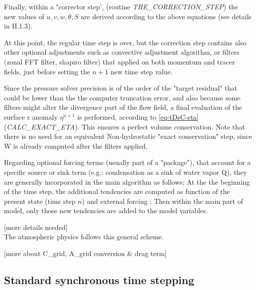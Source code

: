 Finally, within a "corrector step', 
(routine {\it THE\_CORRECTION\_STEP})
the new values of $u,v,w,\theta,S$ 
are derived according to the above equations
(see details in II.1.3). 

At this point, the regular time step is over, but  
the correction step contains also other optional
adjustments such as convective adjustment algorithm, or filters 
(zonal FFT filter, shapiro filter)
that applied on both momentum and tracer fields.
just before setting the $n+1$ new time step value.

Since the pressure solver precision is of the order of
the "target residual" that could be lower than the 
the computer truncation error, and also because some filters 
might alter the divergence part of the flow field,
a final evaluation of the surface r anomaly $\eta^{n+1}$
is performed, according to \ref{eq-tDsC-eta} ({\it CALC\_EXACT\_ETA}).
This ensures a perfect volume conservation.
Note that there is no need for an equivalent Non-hydrostatic
"exact conservation" step, since W is already computed after 
the filters applied.

Regarding optional forcing terms (usually part of a "package"), 
that account for a specific source or sink term (e.g.: condensation
as a sink of water vapor Q), they are generally incorporated 
in the main algorithm as follows;
At the the beginning of the time step,
the additional tendencies are computed
as function of the present state (time step $n$) and external forcing ;
Then within the main part of model,
only those new tendencies are added to the model variables.

[more details needed]\\

The atmospheric physics follows this general scheme.

[more about C\_grid, A\_grid conversion \& drag term]\\

\subsection{Standard synchronous time stepping}

